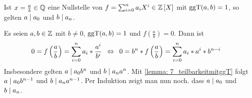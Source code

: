 \begin{exercisePage}
	\begin{exercise} %
		Ist $x = \frac{a}{b} \in \mathbb{Q}$ eine Nullstelle von $f=\sum\nolimits_{i=0}^{n}{a_i X^i} \in \mathbb{Z} \left[ X \right]$ mit $\operatorname{ggT}(a,b) = 1$, so gelten $a \mathrel{\mid} a_0$ und $b \mathrel{\mid} a_n$.
	\end{exercise}
	
	\begin{solution}
		Es seien $a, b \in \mathbb{Z}$ mit $b \neq 0$, $\operatorname{ggT}(a,b) = 1$ und $f\left(\frac{a}{b}\right) = 0$. Dann ist 
		\begin{equation*}
			0 = f\left(\frac{a}{b}\right) = \sum_{i=0}^{n}{a_i* \frac{a^i}{b^i}} \enskip \Leftrightarrow \enskip 0 = b^n * f\left(\frac{a}{b}\right) = \sum_{i=0}^{n}{a_i * a^i * b^{n-i}}
		\end{equation*}
		Insbesondere gelten $a \mathrel{\mid} a_0 b^n$ und $b \mathrel{\mid} a_n a^n$. Mit \cref{lemma: 7_teilbarkeitmitggT} folgt $a \mathrel{\mid} a_0 b^{n-1}$ und $b \mathrel{\mid} a_n a^{n-1}$. Per Induktion zeigt man nun noch. dass $a \mathrel{\mid} a_0$ und $b \mathrel{\mid} a_n$.
	\end{solution}


\end{exercisePage}
